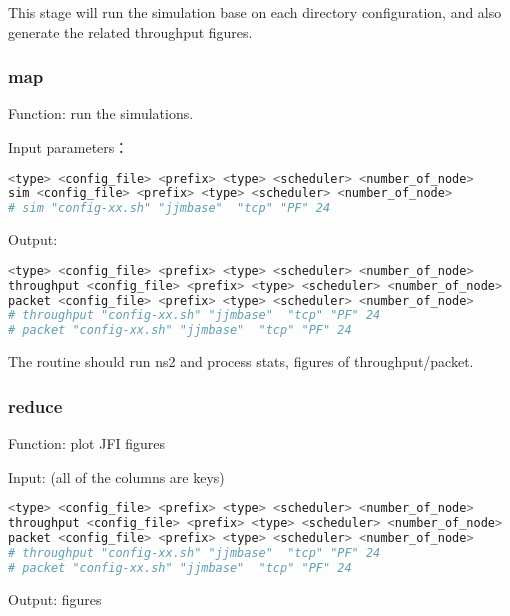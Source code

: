 This stage will run the simulation base on each directory configuration,
and also generate the related throughput figures.


\subsubsection{map}
Function: run the simulations.


Input parameters：
\begin{lstlisting}[language=bash]
<type> <config_file> <prefix> <type> <scheduler> <number_of_node>
sim <config_file> <prefix> <type> <scheduler> <number_of_node>
# sim "config-xx.sh" "jjmbase"  "tcp" "PF" 24
\end{lstlisting}


Output:
\begin{lstlisting}[language=bash]
<type> <config_file> <prefix> <type> <scheduler> <number_of_node>
throughput <config_file> <prefix> <type> <scheduler> <number_of_node>
packet <config_file> <prefix> <type> <scheduler> <number_of_node>
# throughput "config-xx.sh" "jjmbase"  "tcp" "PF" 24
# packet "config-xx.sh" "jjmbase"  "tcp" "PF" 24
\end{lstlisting}

The routine should run ns2 and process stats, figures of throughput/packet.




\subsubsection{reduce}
Function: plot JFI figures


Input: (all of the columns are keys)
\begin{lstlisting}[language=bash]
<type> <config_file> <prefix> <type> <scheduler> <number_of_node>
throughput <config_file> <prefix> <type> <scheduler> <number_of_node>
packet <config_file> <prefix> <type> <scheduler> <number_of_node>
# throughput "config-xx.sh" "jjmbase"  "tcp" "PF" 24
# packet "config-xx.sh" "jjmbase"  "tcp" "PF" 24
\end{lstlisting}

Output: figures

